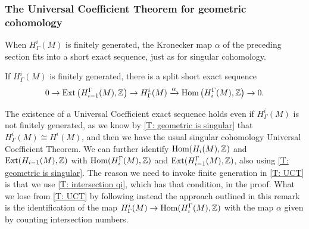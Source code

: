 
\subsubsection{The Universal Coefficient Theorem for geometric cohomology}\label{S: UCT}
When $H^i_\Gamma(M)$ is finitely generated, the Kronecker map $\alpha$ of the preceding section fits into a short exact sequence, just as for singular cohomology.

\begin{theorem}\label{T: UCT}
	If $H^i_\Gamma(M)$ is finitely generated, there is a split short exact sequence
	\[
	0 \to \textup{Ext}\left(H_{i-1}^\Gamma(M),\mathbb{Z}\right) \to H^i_\Gamma(M) \xrightarrow{\alpha} \textup{Hom}\left(H_i^\Gamma(M),\mathbb{Z}\right) \to 0.
	\]
\end{theorem}

\begin{remark}
	The existence of a Universal Coefficient exact sequence holds even if $H^i_\Gamma(M)$ is not finitely generated, as we know by \cref{T: geometric is singular} that $H^i_\Gamma(M) \cong H^i(M)$, and then we have the usual singular cohomology Universal Coefficient Theorem.
	We can further identify $\textup{Hom}(H_i(M),\mathbb{Z})$ and $\textup{Ext}(H_{i-1}(M),\mathbb{Z})$ with $\textup{Hom}(H^\Gamma_i(M),\mathbb{Z})$ and $\textup{Ext}(H^\Gamma_{i-1}(M),\mathbb{Z})$, also using \cref{T: geometric is singular}.
	The reason we need to invoke finite generation in \cref{T: UCT} is that we use \cref{T: intersection qi}, which has that condition, in the proof. What we lose from \cref{T: UCT} by following instead the approach outlined in this remark is the identification of the map $H^i_\Gamma(M) \to \textup{Hom}(H_i^\Gamma(M),\mathbb{Z})$ with the map $\alpha$ given by counting intersection numbers.
\end{remark}

